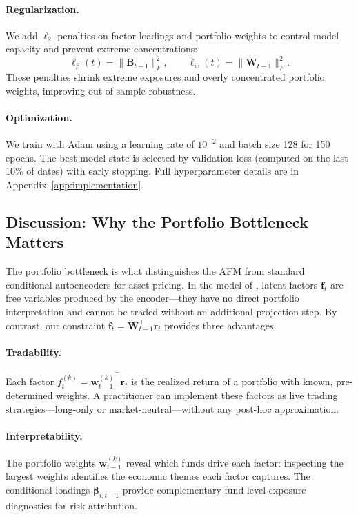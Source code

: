\paragraph{Regularization.} We add $\ell_2$ penalties on factor loadings and portfolio weights to control model capacity and prevent extreme concentrations:
\begin{equation}\label{eq:reg}
    \ell_{\beta}(t) = \|\mathbf{B}_{t-1}\|_F^2, \qquad \ell_{w}(t) = \|\mathbf{W}_{t-1}\|_F^2.
\end{equation}
These penalties shrink extreme exposures and overly concentrated portfolio weights, improving out-of-sample robustness.

\paragraph{Optimization.} We train with Adam \citep{Kingma2015Adam} using a learning rate of $10^{-2}$ and batch size 128 for 150 epochs. The best model state is selected by validation loss (computed on the last 10\% of dates) with early stopping. Full hyperparameter details are in Appendix~\ref{app:implementation}.


\subsection{Discussion: Why the Portfolio Bottleneck Matters}\label{sec:discussion}

The portfolio bottleneck is what distinguishes the AFM from standard conditional autoencoders for asset pricing. In the model of \citet{GuKellyXiu2021autoencoder}, latent factors $\mathbf{f}_t$ are free variables produced by the encoder---they have no direct portfolio interpretation and cannot be traded without an additional projection step. By contrast, our constraint $\mathbf{f}_t = \mathbf{W}_{t-1}^\top \mathbf{r}_t$ provides three advantages.

\paragraph{Tradability.} Each factor $f_t^{(k)} = {\mathbf{w}_{t-1}^{(k)}}^\top \mathbf{r}_t$ is the realized return of a portfolio with known, pre-determined weights. A practitioner can implement these factors as live trading strategies---long-only or market-neutral---without any post-hoc approximation.

\paragraph{Interpretability.} The portfolio weights $\mathbf{w}_{t-1}^{(k)}$ reveal which funds drive each factor: inspecting the largest weights identifies the economic themes each factor captures. The conditional loadings $\boldsymbol{\beta}_{i,t-1}$ provide complementary fund-level exposure diagnostics for risk attribution.

